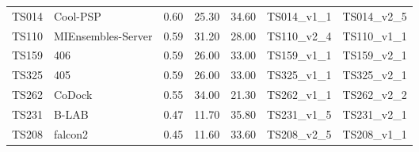 \begin{table}[ht]
{\begin{tabular}{llrrrll}
TS014 & Cool-PSP & 0.60 & 25.30 & 34.60 & TS014\_v1\_1 & TS014\_v2\_5 \\ 
TS110 & MIEnsembles-Server & 0.59 & 31.20 & 28.00 & TS110\_v2\_4 & TS110\_v1\_1 \\ 
TS159 & 406 & 0.59 & 26.00 & 33.00 & TS159\_v1\_1 & TS159\_v2\_1 \\ 
TS325 & 405 & 0.59 & 26.00 & 33.00 & TS325\_v1\_1 & TS325\_v2\_1 \\ 
TS262 & CoDock & 0.55 & 34.00 & 21.30 & TS262\_v1\_1 & TS262\_v2\_2 \\ 
TS231 & B-LAB & 0.47 & 11.70 & 35.80 & TS231\_v1\_5 & TS231\_v2\_1 \\ 
TS208 & falcon2 & 0.45 & 11.60 & 33.60 & TS208\_v2\_5 & TS208\_v1\_1 \\ 
\bottomrule
\end{tabular}%
}
\end{table}
